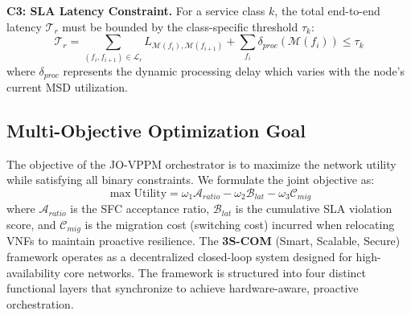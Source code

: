 \documentclass[12pt, a4paper, reqno, oneside]{book}
\begin{document}
\textbf{C3: SLA Latency Constraint.} For a service class $k$, the total end-to-end latency $\mathcal{T}_r$ must be bounded by the class-specific threshold $\tau_k$:
\begin{equation}
\mathcal{T}_r = \sum_{(f_i, f_{i+1}) \in \mathcal{L}_r} L_{\mathcal{M}(f_i), \mathcal{M}(f_{i+1})} + \sum_{f_i} \delta_{proc}(\mathcal{M}(f_i)) \le \tau_k
\end{equation}
where $\delta_{proc}$ represents the dynamic processing delay which varies with the node's current MSD utilization.

\subsection{Multi-Objective Optimization Goal}
The objective of the JO-VPPM orchestrator is to maximize the network utility while satisfying all binary constraints. We formulate the joint objective as:
\begin{equation}
\max \text{Utility} = \omega_1 \mathcal{A}_{ratio} - \omega_2 \mathcal{B}_{lat} - \omega_3 \mathcal{C}_{mig}
\end{equation}
where $\mathcal{A}_{ratio}$ is the SFC acceptance ratio, $\mathcal{B}_{lat}$ is the cumulative SLA violation score, and $\mathcal{C}_{mig}$ is the migration cost (switching cost) incurred when relocating VNFs to maintain proactive resilience.
The \textbf{3S-COM} (Smart, Scalable, Secure) framework operates as a decentralized closed-loop system designed for high-availability core networks. The framework is structured into four distinct functional layers that synchronize to achieve hardware-aware, proactive orchestration.
\end{document}

